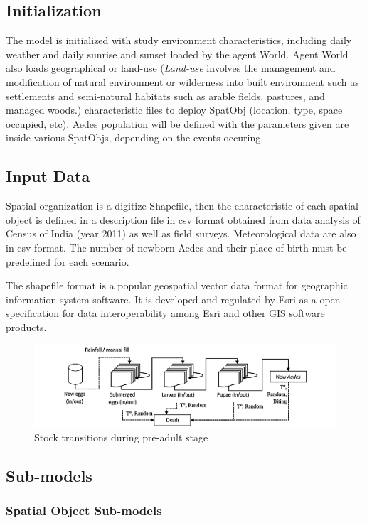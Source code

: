 \subsection{Initialization}

The model is initialized with study environment characteristics, including daily weather and daily sunrise and sunset loaded by the agent World. Agent World also loads geographical or land-use (\textit{Land-use} involves the management and modification of natural environment or wilderness into built environment such as settlements and semi-natural habitats such as arable fields, pastures, and managed woods.) characteristic files to deploy SpatObj (location, type, space occupied, etc). Aedes population will be defined with the parameters given are inside various SpatObjs, depending on the events occuring.

\subsection{Input Data}

    Spatial organization is a digitize Shapefile, then the characteristic of each spatial object is defined in a description file in csv format obtained from data analysis of Census of India (year 2011) as well as field surveys. Meteorological data are also in csv format. The number of newborn Aedes and their place of birth must be predefined for each scenario.
		
	The shapefile format is a popular geospatial vector data format for geographic information system software. It is developed and regulated by Esri as a open specification for data interoperability among Esri and other GIS software products.
\begin{figure}[here]
     \centering \includegraphics[width = 17cm]{fig2.png}
        \caption{Stock transitions during pre-adult stage}
\end{figure}
\subsection{Sub-models}
    \subsubsection{Spatial Object Sub-models}
    
